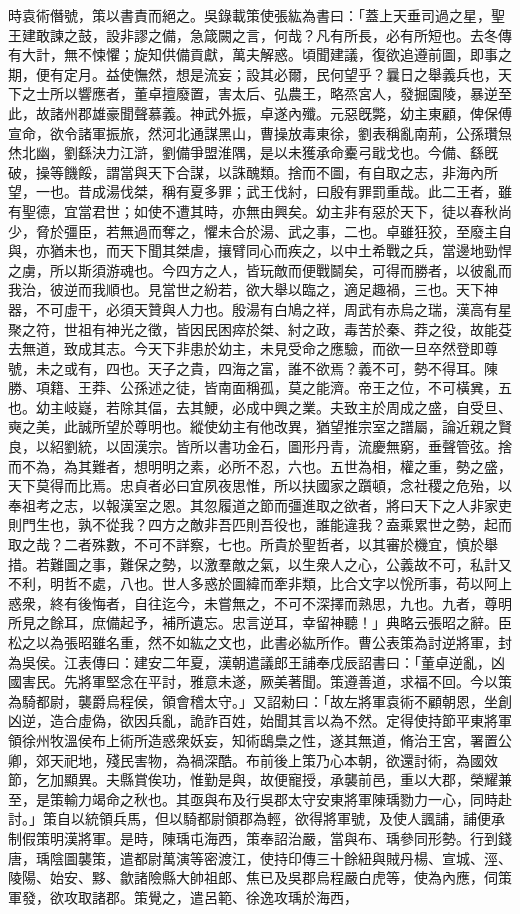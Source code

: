 \begin{pinyinscope}
時袁術僭號，策以書責而絕之。吳錄載策使張紘為書曰：「蓋上天垂司過之星，聖王建敢諫之鼓，設非謬之備，急箴闕之言，何哉？凡有所長，必有所短也。去冬傳有大計，無不悚懼；旋知供備貢獻，萬夫解惑。頃聞建議，復欲追遵前圖，即事之期，便有定月。益使憮然，想是流妄；設其必爾，民何望乎？曩日之舉義兵也，天下之士所以響應者，董卓擅廢置，害太后、弘農王，略烝宮人，發掘園陵，暴逆至此，故諸州郡雄豪聞聲慕義。神武外振，卓遂內殲。元惡旣斃，幼主東顧，俾保傅宣命，欲令諸軍振旅，然河北通謀黑山，曹操放毒東徐，劉表稱亂南荊，公孫瓚炰烋北幽，劉繇決力江滸，劉備爭盟淮隅，是以未獲承命櫜弓戢戈也。今備、繇旣破，操等饑餒，謂當與天下合謀，以誅醜類。捨而不圖，有自取之志，非海內所望，一也。昔成湯伐桀，稱有夏多罪；武王伐紂，曰殷有罪罰重哉。此二王者，雖有聖德，宜當君世；如使不遭其時，亦無由興矣。幼主非有惡於天下，徒以春秋尚少，脅於彊臣，若無過而奪之，懼未合於湯、武之事，二也。卓雖狂狡，至廢主自與，亦猶未也，而天下聞其桀虐，攘臂同心而疾之，以中土希戰之兵，當邊地勁悍之虜，所以斯須游魂也。今四方之人，皆玩敵而便戰鬬矣，可得而勝者，以彼亂而我治，彼逆而我順也。見當世之紛若，欲大舉以臨之，適足趣禍，三也。天下神器，不可虛干，必須天贊與人力也。殷湯有白鳩之祥，周武有赤烏之瑞，漢高有星聚之符，世祖有神光之徵，皆因民困瘁於桀、紂之政，毒苦於秦、莽之役，故能芟去無道，致成其志。今天下非患於幼主，未見受命之應驗，而欲一旦卒然登即尊號，未之或有，四也。天子之貴，四海之富，誰不欲焉？義不可，勢不得耳。陳勝、項籍、王莽、公孫述之徒，皆南面稱孤，莫之能濟。帝王之位，不可橫兾，五也。幼主岐嶷，若除其偪，去其鯁，必成中興之業。夫致主於周成之盛，自受旦、奭之美，此誠所望於尊明也。縱使幼主有他改異，猶望推宗室之譜屬，論近親之賢良，以紹劉統，以固漢宗。皆所以書功金石，圖形丹青，流慶無窮，垂聲管弦。捨而不為，為其難者，想明明之素，必所不忍，六也。五世為相，權之重，勢之盛，天下莫得而比焉。忠貞者必曰宜夙夜思惟，所以扶國家之躓頓，念社稷之危殆，以奉祖考之志，以報漢室之恩。其忽履道之節而彊進取之欲者，將曰天下之人非家吏則門生也，孰不從我？四方之敵非吾匹則吾役也，誰能違我？盍乘累世之勢，起而取之哉？二者殊數，不可不詳察，七也。所貴於聖哲者，以其審於機宜，慎於舉措。若難圖之事，難保之勢，以激羣敵之氣，以生衆人之心，公義故不可，私計又不利，明哲不處，八也。世人多惑於圖緯而牽非類，比合文字以恱所事，苟以阿上惑衆，終有後悔者，自往迄今，未嘗無之，不可不深擇而熟思，九也。九者，尊明所見之餘耳，庶備起予，補所遺忘。忠言逆耳，幸留神聽！」典略云張昭之辭。臣松之以為張昭雖名重，然不如紘之文也，此書必紘所作。曹公表策為討逆將軍，封為吳侯。江表傳曰：建安二年夏，漢朝遣議郎王誧奉戊辰詔書曰：「董卓逆亂，凶國害民。先將軍堅念在平討，雅意未遂，厥美著聞。策遵善道，求福不回。今以策為騎都尉，襲爵烏程侯，領會稽太守。」又詔勑曰：「故左將軍袁術不顧朝恩，坐創凶逆，造合虛偽，欲因兵亂，詭詐百姓，始聞其言以為不然。定得使持節平東將軍領徐州牧溫侯布上術所造惑衆妖妄，知術鴟梟之性，遂其無道，脩治王宮，署置公卿，郊天祀地，殘民害物，為禍深酷。布前後上策乃心本朝，欲還討術，為國效節，乞加顯異。夫縣賞俟功，惟勤是與，故便寵授，承襲前邑，重以大郡，榮耀兼至，是策輸力竭命之秋也。其亟與布及行吳郡太守安東將軍陳瑀勠力一心，同時赴討。」策自以統領兵馬，但以騎都尉領郡為輕，欲得將軍號，及使人諷誧，誧便承制假策明漢將軍。是時，陳瑀屯海西，策奉詔治嚴，當與布、瑀參同形勢。行到錢唐，瑀陰圖襲策，遣都尉萬演等密渡江，使持印傳三十餘紐與賊丹楊、宣城、涇、陵陽、始安、黟、歙諸險縣大帥祖郎、焦已及吳郡烏程嚴白虎等，使為內應，伺策軍發，欲攻取諸郡。策覺之，遣呂範、徐逸攻瑀於海西，
\end{pinyinscope}
